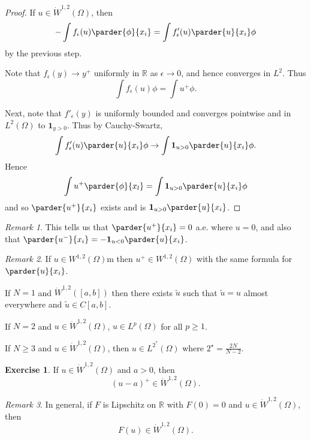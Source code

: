 \documentclass[10pt, oneside, reqno]{amsart}
\theoremstyle{plain}%
\numberwithin{equation}{section}
\theoremstyle{definition}
\newtheorem{exer}[thm]{Exercise}
\theoremstyle{remark}
\newtheorem*{rem}{Remark}
\newcommand{\R}{\mathbb{R}}
\begin{document}
\begin{proof}
    If $u \in \dot W^{1, 2}(\Omega)$, then \begin{align*}
        -\int f_\epsilon (u) \parder{\phi}{x_i} = \int f'_\epsilon(u) \parder{u}{x_i} \phi
    \end{align*} by the previous step.   
    
    Note that $f_\epsilon (y) \rightarrow y^+$ uniformly in $\R$  as $\epsilon \rightarrow 0$, and hence converges in $L^2$.  Thus \[
        \int f_\epsilon(u) \phi = \int u^+ \phi.
    \]  
    
    Next, note that $f'_\epsilon (y)$ is uniformly bounded and converges pointwise and in $L^2(\Omega)$ to $\mathbf{1}_{y > 0}$.  Thus by Cauchy-Swartz, \[
        \int f'_\epsilon(u) \parder{u}{x_i} \phi \rightarrow \int \mathbf{1}_{u > 0} \parder{u}{x_i} \phi.
    \] Hence \[
        \int u^+ \parder{\phi}{x_l} = \int \mathbf{1}_{u > 0} \parder{u}{x_i} \phi
    \] and so $\parder{u^+}{x_i}$ exists and is $\mathbf{1}_{u > 0} \parder{u}{x_i}$.
\end{proof}  

\begin{rem}
    This tells us that $\parder{u^+}{x_i} = 0$ a.e. where $u = 0$, and also that $\parder{u^-}{x_i} = -\mathbf{1}_{u < 0} \parder{u}{x_i}$.
\end{rem}

\begin{rem}
    If $u \in  W^{1, 2}(\Omega)$m then $u^+ \in W^{1, 2}(\Omega)$ with the same formula for $\parder{u}{x_i}$.  
    
    If $N = 1$ and $\dot W^{1, 2}([a, b])$ then there exists $\tilde u$ such that $\tilde u  = u$ almost everywhere and $\tilde u \in C[a, b]$.
    
    If $N = 2$ and $u \in \dot W^{1, 2}(\Omega)$, $u \in L^p(\Omega)$ for all $p \geq 1$. 
    
    If $N \geq 3$ and $u \in \dot W^{1, 2}(\Omega)$, then $u \in L^{2^*}(\Omega)$ where $2^\star = \frac{2N}{N-2}.$
\end{rem}

\begin{exer}
    If $u \in \dot W^{1, 2}(\Omega)$ and $a > 0$, then \[
        (u-a)^+ \in \dot W^{1, 2}(\Omega).
    \]
\end{exer}

\begin{rem}
    In general, if $F$ is Lipschitz on $\R$ with $F(0) = 0$ and $u \in \dot W^{1, 2}(\Omega)$, then \[
        F(u) \in \dot W^{1, 2}(\Omega).
    \]
\end{rem}
\end{document}
